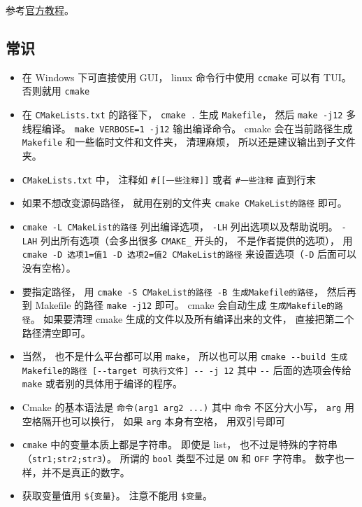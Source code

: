 


参考\href{https://cmake.org/cmake/help/latest/guide/tutorial/index.html}{官方教程}。

\subsection{常识}
\begin{itemize}
\item 在 Windows 下可直接使用 GUI， linux 命令行中使用 \verb`ccmake` 可以有 TUI。 否则就用 \verb`cmake`
\item 在 \verb|CMakeLists.txt| 的路径下， \verb`cmake .` 生成 \verb|Makefile|， 然后 \verb|make -j12| 多线程编译。 \verb|make VERBOSE=1 -j12| 输出编译命令。 cmake 会在当前路径生成 \verb|Makefile| 和一些临时文件和文件夹， 清理麻烦， 所以还是建议输出到子文件夹。
\item \verb|CMakeLists.txt| 中， 注释如 \verb|#[[一些注释]]| 或者 \verb|#一些注释| 直到行末
\item 如果不想改变源码路径， 就用在别的文件夹 \verb|cmake CMakeList的路径| 即可。
\item \verb|cmake -L CMakeList的路径| 列出编译选项， \verb|-LH| 列出选项以及帮助说明。 \verb|-LAH| 列出所有选项（会多出很多 \verb|CMAKE_| 开头的， 不是作者提供的选项）， 用 \verb|cmake -D 选项1=值1 -D 选项2=值2 CMakeList的路径| 来设置选项（\verb|-D| 后面可以没有空格）。
\item 要指定路径， 用 \verb|cmake -S CMakeList的路径 -B 生成Makefile的路径|， 然后再到 Makefile 的路径 \verb|make -j12| 即可。 cmake 会自动生成 \verb|生成Makefile的路径|。 如果要清理 cmake 生成的文件以及所有编译出来的文件， 直接把第二个路径清空即可。
\item 当然， 也不是什么平台都可以用 \verb|make|， 所以也可以用 \verb|cmake --build 生成Makefile的路径 [--target 可执行文件] -- -j 12| 其中 \verb|--| 后面的选项会传给 \verb|make| 或者别的具体用于编译的程序。
\item Cmake 的基本语法是 \verb`命令(arg1 arg2 ...)` 其中 \verb|命令| 不区分大小写， \verb`arg` 用空格隔开也可以换行， 如果 \verb|arg| 本身有空格， 用双引号即可
\item \verb|cmake| 中的变量本质上都是字符串。 即使是 list， 也不过是特殊的字符串（\verb|str1;str2;str3|）。 所谓的 \verb|bool| 类型不过是 \verb|ON| 和 \verb|OFF| 字符串。 数字也一样，并不是真正的数字。
\item 获取变量值用 \verb`${变量}`。 注意不能用 \verb|$变量|。

\end{itemize}
